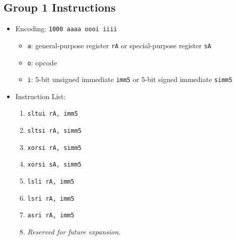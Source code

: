 \documentclass{article}
\begin{document}
	\subsection{Group 1 Instructions}
		\begin{itemize}
		\item Encoding:  \texttt{1000 aaaa oooi iiii}
			\begin{itemize}
			\item \texttt{a}:  general-purpose register \texttt{rA} or
				special-purpose register \texttt{sA}
			\item \texttt{o}:  opcode
			\item \texttt{i}:  5-bit unsigned immediate \texttt{imm5} or
				5-bit signed immediate \texttt{simm5}
			\end{itemize}
		\item Instruction List:
			\begin{enumerate}
			\item \texttt{sltui rA, imm5}
			\item \texttt{sltsi rA, simm5}
			\item \texttt{xorsi rA, simm5}
			\item \texttt{xorsi sA, simm5}

			\item \texttt{lsli rA, imm5}
			\item \texttt{lsri rA, imm5}
			\item \texttt{asri rA, imm5}
			\item \textit{Reserved for future expansion.}
			\end{enumerate}
		\end{itemize}
\end{document}
